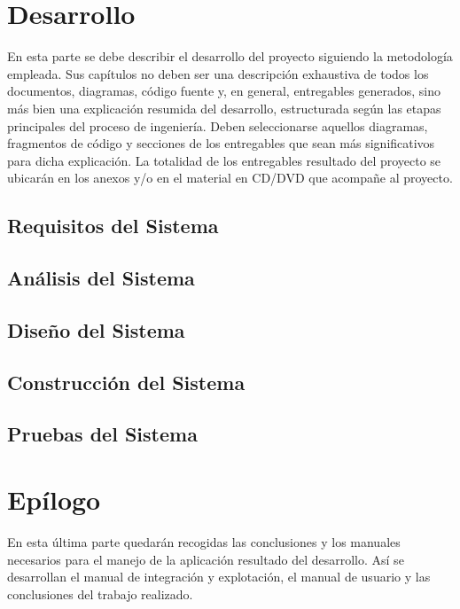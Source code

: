 \documentclass[a4paper,11pt]{book}
\begin{document}
\part{Desarrollo}
\null\vfill
\noindent En esta parte se debe describir el desarrollo del proyecto siguiendo la metodología empleada. Sus capítulos no deben ser una descripción exhaustiva de todos los documentos, diagramas, código fuente y, en general, entregables generados, sino más bien una explicación resumida del desarrollo, estructurada según las etapas principales del proceso de ingeniería. Deben seleccionarse aquellos diagramas, fragmentos de código y secciones de los entregables que sean más significativos para dicha explicación. La totalidad de los entregables resultado del proyecto se ubicarán en los anexos y/o en el material en CD/DVD que acompañe al proyecto.

\chapter{Requisitos del Sistema}


\chapter{Análisis del Sistema}


\chapter{Diseño del Sistema}


\chapter{Construcción del Sistema}


\chapter{Pruebas del Sistema}


\part{Epílogo}
\null\vfill
\noindent En esta última parte quedarán recogidas las conclusiones y los manuales necesarios para el manejo de la aplicación resultado del desarrollo. Así se desarrollan el 
manual de integración y explotación, el manual de usuario y las conclusiones del trabajo realizado.
\vfill
\end{document}
